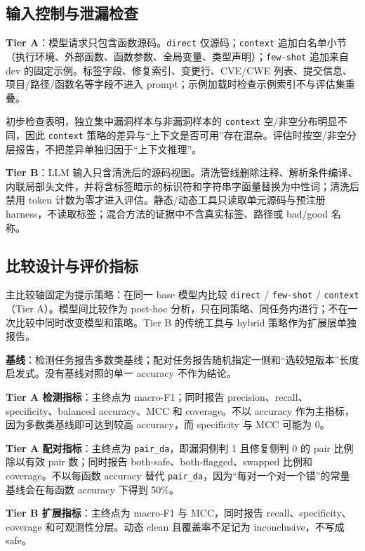 \documentclass[conference]{IEEEtran}
\begin{document}
\subsection{输入控制与泄漏检查}
\label{sec:eval-input}

\textbf{Tier A}：模型请求只包含函数源码。\texttt{direct} 仅源码；\texttt{context} 追加白名单小节（执行环境、外部函数、函数参数、全局变量、类型声明）；\texttt{few-shot} 追加来自 dev 的固定示例。标签字段、修复索引、变更行、CVE/CWE 列表、提交信息、项目/路径/函数名等字段不进入 prompt；示例加载时检查示例索引不与评估集重叠。

初步检查表明，独立集中漏洞样本与非漏洞样本的 \texttt{context} 空/非空分布明显不同，因此 \texttt{context} 策略的差异与“上下文是否可用”存在混杂。评估时按空/非空分层报告，不把差异单独归因于“上下文推理”。

\textbf{Tier B}：LLM 输入只含清洗后的源码视图。清洗管线删除注释、解析条件编译、内联局部头文件，并将含标签暗示的标识符和字符串字面量替换为中性词；清洗后禁用 token 计数为零才进入评估。静态/动态工具只读取单元源码与预注册 harness，不读取标签；混合方法的证据中不含真实标签、路径或 bad/good 名称。

\subsection{比较设计与评价指标}
\label{sec:eval-design}

主比较轴固定为提示策略：在同一 base 模型内比较 \texttt{direct} / \texttt{few-shot} / \texttt{context}（Tier A）。模型间比较作为 post-hoc 分析，只在同策略、同任务内进行；不在一次比较中同时改变模型和策略。Tier B 的传统工具与 hybrid 策略作为扩展层单独报告。

\textbf{基线}：检测任务报告多数类基线；配对任务报告随机指定一侧和“选较短版本”长度启发式。没有基线对照的单一 accuracy 不作为结论。

\textbf{Tier A 检测指标}：主终点为 macro-F1；同时报告 precision、recall、specificity、balanced accuracy、MCC 和 coverage。不以 accuracy 作为主指标，因为多数类基线即可达到较高 accuracy，而 specificity 与 MCC 可能为 0。

\textbf{Tier A 配对指标}：主终点为 \texttt{pair\_da}，即漏洞侧判 1 且修复侧判 0 的 pair 比例除以有效 pair 数；同时报告 both-safe、both-flagged、swapped 比例和 coverage。不以每函数 accuracy 替代 \texttt{pair\_da}，因为“每对一个对一个错”的常量基线会在每函数 accuracy 下得到 50\%。

\textbf{Tier B 扩展指标}：主终点为 macro-F1 与 MCC，同时报告 recall、specificity、coverage 和可观测性分层。动态 clean 且覆盖率不足记为 inconclusive，不写成 safe。
\end{document}
